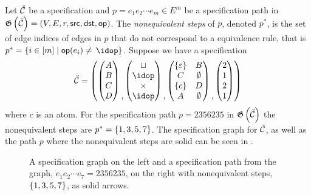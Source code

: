 Let $\check{\mathcal{C}}$ be a specification and $p=e_1e_2\dotsm e_m \in E^m$ be a specification path in $\mathfrak{G}\left(\check{\mathcal{C}}\right) = (V,E,r,\textsf{src}, \textsf{dst}, \textsf{op})$. The \emph{nonequivalent steps} of $p$, denoted $p^\ast$, is the set of edge indices of edges in $p$ that do not correspond to a equivalence rule, that is $p^\ast = \cset{i\in[m]}{\op(e_i) \neq\, \idop}$. Suppose we have a specification  
\[
    \spec{C} = \left(\begin{pmatrix}A\\B\\C\\D\end{pmatrix}\begin{matrix}\\\\\\,\end{matrix} \begin{pmatrix}\sqcup\\ \idop\\ \times\\ \idop\end{pmatrix}\begin{matrix}\\\\\\,\end{matrix}\begin{pmatrix} \set{\varepsilon} & B \\ C & \emptyset \\ \set{c} & D \\ A & \emptyset\end{pmatrix}\begin{matrix}\\\\\\,\end{matrix}\begin{pmatrix}2\\1\\2\\1\end{pmatrix}\right)
\]
where $c$ is an atom. For the specification path $p = 2356235$ in $\mathfrak{G}\left(\check{\mathcal{C}}\right)$ the nonequivalent steps are $p^\ast = \left\{1,3,5,7\right\}$. The specification graph for $\check{\mathcal{C}}$, as well as the path $p$ where the nonequivalent steps are solid can be seen in . 
\begin{figure}[ht!]
    \centering
    
    \caption{A specification graph on the left and a specification path from the graph, $e_1e_2\dotsm e_7=2356235$, on the right with nonequivalent steps, $\left\{1,3,5,7\right\}$, as solid arrows.}
    \label{fig:noneqsteps}
\end{figure}


